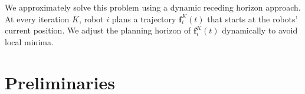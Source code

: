 \documentclass{svproc}
\newcommand{\vp}{\mathbf{p}}
\newcommand{\vf}{\mathbf{f}}
\newcommand{\vo}{\mathbf{o}}
\newcommand{\cO}{\mathcal{O}}
\newcommand{\todo}[1]{\textbf{\textcolor{red}{TODO: #1}}}
\begin{document}
We approximately solve this problem using a dynamic receding horizon approach.
At every iteration $K$, robot $i$ plans a trajectory $\vf^{K}_i(t)$ that starts at the robots' current position.
We adjust the planning horizon of $\vf^{K}_i(t)$ dynamically to avoid local minima.





\section{Preliminaries}
\end{document}
